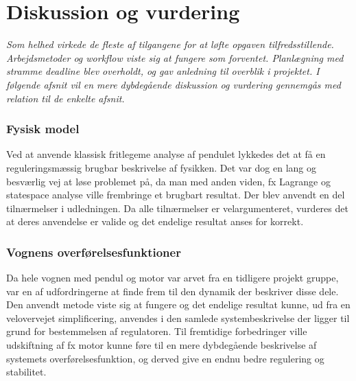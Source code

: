 \chapter{Diskussion og vurdering}\label{kap:diskussion}
\emph{Som helhed virkede de fleste af tilgangene for at løfte opgaven tilfredsstillende.
Arbejdsmetoder og workflow viste sig at fungere som forventet.
Planlægning med stramme deadline blev overholdt, og gav anledning til overblik i projektet.
I følgende afsnit vil en mere dybdegående diskussion og vurdering gennemgås med relation til de enkelte afsnit. }

\subsection{Fysisk model}
Ved at anvende klassisk fritlegeme analyse af pendulet lykkedes det at få en reguleringsmæssig brugbar beskrivelse af fysikken. 
Det var dog en lang og besværlig vej at løse problemet på, da man med anden viden, fx Lagrange og statespace analyse ville frembringe et brugbart resultat.
Der blev anvendt en del tilnærmelser i udledningen. 
Da alle tilnærmelser er velargumenteret, vurderes det at deres anvendelse er valide og det endelige resultat anses for korrekt.   

\subsection{Vognens overførelsesfunktioner}
Da hele vognen med pendul og motor var arvet fra en tidligere projekt gruppe, var en af udfordringerne at finde frem til den dynamik der beskriver disse dele.
Den anvendt metode viste sig at fungere og det endelige resultat kunne, ud fra en velovervejet simplificering, anvendes i den samlede systembeskrivelse der ligger til grund for bestemmelsen af regulatoren.
Til fremtidige forbedringer ville udskiftning af fx motor kunne føre til en mere dybdegående beskrivelse af systemets overførelsesfunktion, og derved give en endnu bedre regulering og stabilitet.

